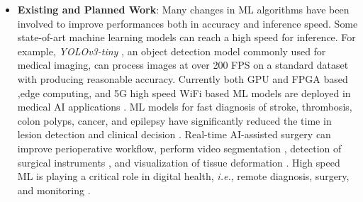 \begin{itemize}
        \item \textbf{Existing and Planned Work}: Many changes in ML algorithms have been involved to improve performances both in accuracy and inference speed. Some state-of-art machine learning models can reach a high speed for inference. For example, \textit{YOLOv3-tiny} \cite{Adarsh2020-hq}, an object detection model commonly used for medical imaging, can process images at over 200 FPS on a standard dataset with producing reasonable accuracy. Currently both GPU and FPGA based \cite{Satpathy2020-gs,Chang2020-ob,Zhang2020-bb},edge computing, and 5G high speed WiFi based ML models are deployed in medical AI applications \cite{Chen2018-qx,Zhang2020-ze,Morocho-Cayamcela2019-gt}. ML models for fast diagnosis of stroke, thrombosis, colon polyps, cancer, and epilepsy have significantly reduced the time in lesion detection and clinical decision \cite{Lee2020-oj,Nafee2020-yy,Nogueira-Rodriguez2020-zd,Bagheri2019-ee,Horie2019-hz}. Real-time AI-assisted surgery can improve perioperative workflow, perform video segmentation \cite{Volkov2017-oy}, detection of surgical instruments \cite{Choi2017-iv}, and visualization of tissue deformation \cite{Tonutti2017-vv}. High speed ML is playing a critical role in digital health, \textit{i.e.}, remote diagnosis, surgery, and monitoring \cite{Zhang2020-ze}.

    \end{itemize}

